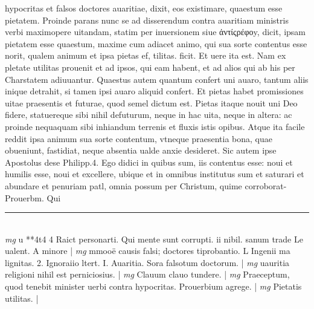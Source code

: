 \documentclass{article}
\begin{document}
\begin{pages}
hypocritas et falsos doctores auaritiae, dixit, eos existimare, quaestum esse pietatem. Proinde parans nunc se ad disserendum contra auaritiam ministris verbi maximopere uitandam, statim per inuersionem siue ἀντίςρέφοy, dicit, ipsam pietatem esse quaestum, maxime cum adiacet animo, qui sua sorte contentus esse norit, qualem animum et ipsa pietas ef, tilitas. ficit. Et uere ita est. Nam ex pletate utilitas prouenit et ad ipsos, qui eam habent, et ad alios qui ab his per Charstatem adiuuantur. Quaestus autem quantum confert uni auaro, tantum aliis inique detrahit, si tamen ipsi auaro aliquid confert. Et pietas habet promissiones uitae praesentis et futurae, quod semel dictum est. Pietas itaque nouit uni Deo fidere, statuereque sibi nihil defuturum, neque in hac uita, neque in altera: ac proinde nequaquam sibi inhiandum terrenis et fluxis istis opibus. Atque ita facile reddit ipsa animum sua sorte contentum, vtneque praesentia bona, quae obueniunt, fastidiat, neque absentia ualde anxie desideret. Sic autem ipse Apostolus dese Philipp.4. Ego didici in quibus sum, iis contentus esse: noui et humilis esse, noui et excellere, ubique et in omnibus institutus sum et saturari et abundare et penuriam patl, omnia possum per Christum, quime corroborat-Prouerbm. Qui  \pend
\vspace{0.5cm}\noindent
\vspace{0.2cm}\rule{1cm}{0.2pt}\\ 
\hspace{0.2cm}\textit{mg}
\footnotesize u **4t4 4 Raict personarti. Qui mente sunt corrupti. ii nibil. sanum trade Le ualent. A minore 
\normalsize| 
\hspace{0.2cm}\textit{mg}
\footnotesize mmooë causis falsi; doctores tiprobantio. L Ingenii ma lignitas. 2. Ignoraiio ltert. I. Auaritia. Sora falsotum doctorum. 
\normalsize| 
\hspace{0.2cm}\textit{mg}
\footnotesize uauritia religioni nihil est perniciosius. 
\normalsize| 
\hspace{0.2cm}\textit{mg}
\footnotesize Clauum clauo tundere. 
\normalsize| 
\hspace{0.2cm}\textit{mg}
\footnotesize Praeceptum, quod tenebit minister uerbi contra hypocritas. Prouerbium agrege. 
\normalsize| 
\hspace{0.2cm}\textit{mg}
\footnotesize Pietatis utilitas. 
\normalsize| 

\end{pages}
\end{document}
